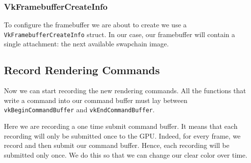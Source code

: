 \begin{minipage}{\linewidth}{\noindent}
    
\end{minipage}

\subsubsection{VkFramebufferCreateInfo}

To configure the framebuffer we are about to create we use a
\texttt{VkFramebufferCreateInfo} struct.
In our case, our framebuffer will contain a single attachment: the next
available swapchain image.

\begin{minipage}{\linewidth}{\noindent}
    
\end{minipage}

\subsection{Record Rendering Commands}

Now we can start recording the new rendering commands.
All the functions that write a command into our command buffer must lay
between \texttt{vkBeginCommandBuffer} and \texttt{vkEndCommandBuffer}.

\begin{minipage}{\linewidth}{\noindent}
    
\end{minipage}

Here we are recording a one time submit command buffer.
It means that each recording will only be submitted once to the GPU.
Indeed, for every frame, we record and then submit our command buffer.
Hence, each recording will be submitted only once.
We do this so that we can change our clear color over time.

\begin{minipage}{\linewidth}{\noindent}
    
\end{minipage}


